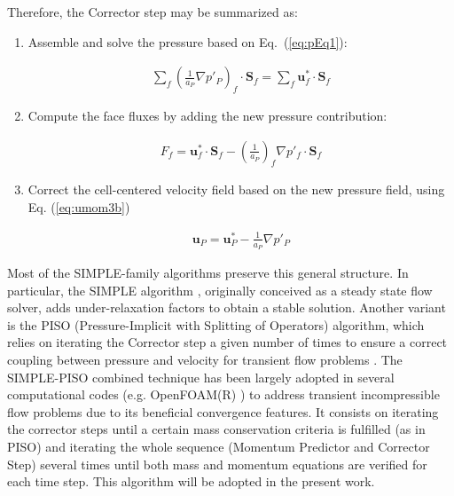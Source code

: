 \documentclass[final,3p,times,10pt,onecolumn]{myElsarticle}
\numberwithin{equation}{section}
\newcommand{\CIP}[1]{{\color{blue} #1}}
\begin{document}
Therefore, the Corrector step may be summarized as:

\begin{enumerate}

\item Assemble and solve the pressure based on Eq.~(\ref{eq:pEq1}):

\begin{equation}
\begin{split}
\sum_{f} \left( \frac{1}{a_P} \nabla p'_P \right)_f \cdotp \textbf{S}_{f} = \sum_{f} \boldsymbol{u}^*_f \cdotp \textbf{S}_{f}
\end{split}
\label{eq:pEq2} 
\end{equation}



\item {\color{red}Compute} the face fluxes by adding the new pressure contribution:

\begin{equation}
\begin{split}
F_f = \boldsymbol{u}^*_f \cdotp \textbf{S}_{f} -  \left( \frac{1}{a_P}\right)_f \nabla p'_f  \cdotp \textbf{S}_{f}
\end{split}
\label{eq:Fhat} 
\end{equation}

\item Correct the cell-centered velocity field based on the new pressure field, using Eq. (\ref{eq:umom3b})

\begin{equation}\label{eq:umom3b}
\begin{split}
\boldsymbol{u}_P = \boldsymbol{u}^*_P - \frac{1}{a_P} \nabla p'_P 
\end{split}
\end{equation}

\end{enumerate}

\fi
Most of the SIMPLE-family algorithms preserve this general structure. In particular, the SIMPLE algorithm \cite{patankar1972}, originally conceived as a steady state flow solver, adds under-relaxation factors to obtain a stable solution. Another variant is the PISO {\color{red}(Pressure-Implicit with Splitting of Operators)} algorithm, which relies on iterating the Corrector step a given number of times to ensure a correct coupling between pressure and velocity for transient flow problems \cite{issa,issa2}. {\color{red} The SIMPLE-PISO combined technique has been largely adopted in several computational codes (e.g. OpenFOAM(R) \cite{ofpg}) to address transient incompressible flow problems due to its beneficial convergence features. It consists on iterating the corrector steps until a certain mass conservation criteria is fulfilled (as in PISO) and iterating the whole sequence (Momentum Predictor and Corrector Step) several times until both mass and momentum equations are verified for each time step. This algorithm will be adopted in the present work.}
\end{document}
